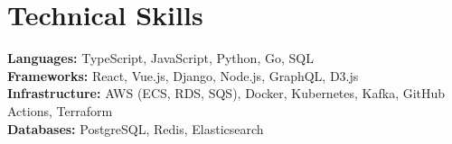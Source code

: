 \documentclass[letterpaper,11pt]{article}
\begin{document}
\section{Technical Skills}
\begin{itemize}[leftmargin=0.15in, label={}]
  \small{\item{\textbf{Languages:} TypeScript, JavaScript, Python, Go, SQL \\
  \textbf{Frameworks:} React, Vue.js, Django, Node.js, GraphQL, D3.js \\
  \textbf{Infrastructure:} AWS (ECS, RDS, SQS), Docker, Kubernetes, Kafka, GitHub Actions, Terraform \\
  \textbf{Databases:} PostgreSQL, Redis, Elasticsearch }}
\end{itemize}
\end{document}
